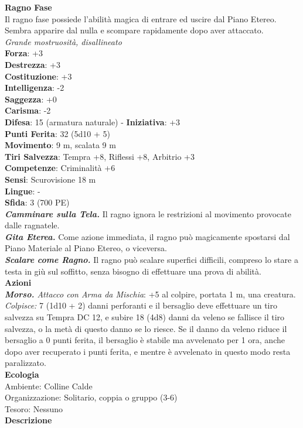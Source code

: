 \begin{multicols}{2}
\medskip\textbf{Ragno Fase}\\
Il ragno fase possiede l'abilità magica di entrare ed uscire dal Piano Etereo. Sembra apparire dal nulla e scompare rapidamente dopo aver attaccato.\\
\emph{Grande mostruosità, disallineato}\\
\textbf{Forza}: +3\\
\textbf{Destrezza}: +3\\
\textbf{Costituzione}: +3\\
\textbf{Intelligenza}: -2\\
\textbf{Saggezza}: +0\\
\textbf{Carisma}: -2\\
\textbf{Difesa}: 15 (armatura naturale) - \textbf{Iniziativa}: +3\\
\textbf{Punti Ferita}: 32 (5d10 + 5)\\
\textbf{Movimento}: 9 m, scalata 9 m\\
\textbf{Tiri Salvezza}: Tempra +8, Riflessi +8, Arbitrio +3 \\
\textbf{Competenze}: Criminalità +6\\
\textbf{Sensi}: Scurovisione 18 m\\
\textbf{Lingue}: -\\
\textbf{Sfida}: 3 (700 PE)\smallskip\\
\emph{\textbf{Camminare sulla Tela.}} Il ragno ignora le restrizioni al movimento provocate dalle ragnatele.\\
\emph{\textbf{Gita Eterea.}} Come azione immediata, il ragno può magicamente spostarsi dal Piano Materiale al Piano Etereo, o viceversa.\\
\emph{\textbf{Scalare come Ragno.}} Il ragno può scalare superfici difficili, compreso lo stare a testa in giù sul soffitto, senza bisogno di effettuare una prova di abilità. \\
\smallskip\textbf{Azioni}\\
\emph{\textbf{Morso.} Attacco con Arma da Mischia}: +5 al colpire, portata 1 m, una creatura.\\
\emph{Colpisce:} 7 (1d10 + 2) danni perforanti e il bersaglio deve effettuare un tiro salvezza su Tempra DC  12, e subire 18 (4d8) danni da veleno se fallisce il tiro salvezza, o la metà di questo danno se lo riesce. Se il danno da veleno riduce il bersaglio a 0 punti ferita, il bersaglio è stabile ma avvelenato per 1 ora, anche dopo aver recuperato i punti ferita, e mentre è avvelenato in questo modo resta paralizzato.\\
\textbf{Ecologia}\\
Ambiente: Colline Calde\\
Organizzazione: Solitario, coppia o gruppo (3-6)\\
Tesoro: Nessuno\\
\textbf{Descrizione}\\


\end{multicols}

